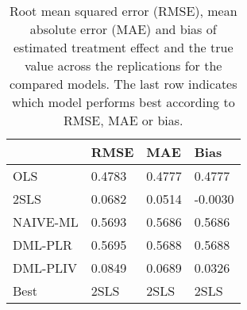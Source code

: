 \begin{table}[H]
\centering
\caption{Root mean squared error (RMSE), mean absolute error (MAE) and bias of estimated treatment effect and the true value across the replications for the compared models. The last row indicates which model performs best according to RMSE, MAE or bias.}
\label{Scenario3}
\begin{tabular}{L{3.3333333333333335cm}L{2.6666666666666665cm}R{2.0cm}R{2.6666666666666665cm}}
\toprule
 & RMSE & MAE & Bias \\
\midrule
OLS & 0.4783 & 0.4777 & 0.4777 \\
2SLS & 0.0682 & 0.0514 & -0.0030 \\
NAIVE-ML & 0.5693 & 0.5686 & 0.5686 \\
DML-PLR & 0.5695 & 0.5688 & 0.5688 \\
DML-PLIV & 0.0849 & 0.0689 & 0.0326 \\
Best & 2SLS & 2SLS & 2SLS \\
\bottomrule
\end{tabular}
\end{table}
